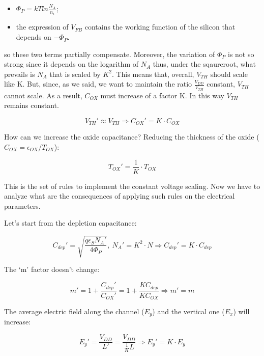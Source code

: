 \documentclass[a4paper, 12pt, twoside, openright]{report}
\begin{document}
\begin{itemize}
\item $\Phi_P = kTln\frac{N_A}{n_i}$;
\item the expression of $V_{FB}$ contains the working function of the silicon that depends on $-\Phi_P$.
\end{itemize}

so these two terms partially compensate. Moreover, the variation of $\Phi_P$ is not so strong since it depends on the logarithm of $N_{A}$ thus, under the sqaureroot, what prevails is $N_{A}$ that is scaled by $K^{2}$. This means that, overall, $V_{TH}$ should scale like K. But, since, as we said, we want to maintain the ratio $\frac{V_{DD}}{V_{TH}}$ constant, $V_{TH}$ cannot scale. As a result, $C_{OX}$ must increase of a factor K. In this way $V_{TH}$ remains constant.

	\begin{equation}
	V_{TH}' \approx V_{TH} \Rightarrow C_{OX}' = K \cdot C_{OX}
	\label{}
	\end{equation}

How can we increase the oxide capacitance? Reducing the thickness of the oxide ($C_{OX} = \epsilon_{OX}/T_{OX}$):

	\begin{equation}
	T_{OX}' = \frac{1}{K} \cdot T_{OX}
	\label{}
	\end{equation}

This is the set of rules to implement the constant voltage scaling. Now we have to analyze what are the consequences of applying such rules on the electrical parameters.

Let's start from the depletion capacitance:

	\begin{equation}
	C_{dep}' = \sqrt{\frac{q\epsilon_S N_A'}{4\Phi_P}},\ N_A' = K^2 \cdot N \Rightarrow C_{dep}' = K \cdot C_{dep}
	\label{}
	\end{equation}

The `m' factor doesn't change:

	\begin{equation}
	m' = 1+\frac{C_{dep}'}{C_{OX}'} = 1+ \frac{KC_{dep}}{KC_{OX}} \Rightarrow m' = m
	\label{}
	\end{equation}

The average electric field along the channel ($E_{y}$) and the vertical one ($E_{x}$) will increase:

	\begin{equation}
	E_y' = \frac{V_{DD}}{L'} = \frac{V_{DD}}{\frac{1}{K}L} \Rightarrow E_y' = K \cdot E_y
	\label{}
	\end{equation}
\end{document}
